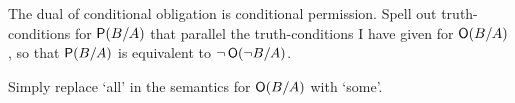 \begin{exercise}
  The dual of conditional obligation is conditional permission. Spell out
  truth-conditions for $\operatorname{\mathsf{P}}(B/A)$ that parallel the truth-conditions I have
  given for $\operatorname{\mathsf{O}}(B/A)$, so that $\operatorname{\mathsf{P}}(B/A)$ is equivalent to
  $\neg \operatorname{\mathsf{O}}(\neg B/A)$.
  


\end{exercise}
\begin{solution}
  Simply replace `all' in the semantics for $\operatorname{\mathsf{O}}(B/A)$ with `some'.
\end{solution}





